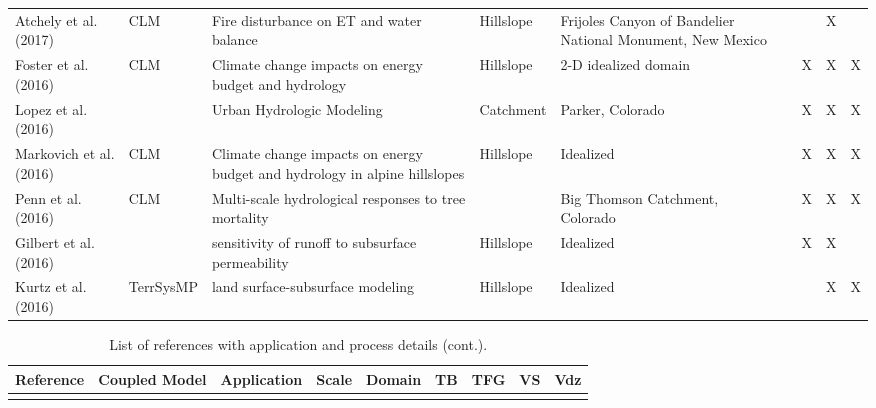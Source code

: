 {\begin{table}
\begin{tabular}{ l  p{1.5cm} p{2cm} p{1.5cm} p{1.5cm} | c | c | c | c }
\cite{Atchley2017} Atchely et al. (2017) & CLM & Fire disturbance on ET and water balance & Hillslope & Frijoles Canyon of Bandelier National Monument, New Mexico & & & X & \\	
\cite{Foster2016} Foster et al. (2016) & CLM & Climate change impacts on energy budget and hydrology & Hillslope & 2-D idealized domain & &X &X &X \\
\cite{Lopez2016} Lopez et al. (2016) &  & Urban Hydrologic Modeling & Catchment & Parker, Colorado & &X &X &X \\
\cite{Markovich2016} Markovich et al. (2016) & CLM & Climate change impacts on energy budget and hydrology in alpine hillslopes & Hillslope & Idealized & &X &X &X \\
\cite{Penn2016} Penn et al. (2016) & CLM & Multi-scale hydrological responses to tree mortality &  & Big Thomson Catchment, Colorado & &X &X &X \\			
\cite{Gilbert2016} Gilbert et al. (2016) &  & sensitivity of runoff to subsurface permeability & Hillslope & Idealized & &X &X & \\			
\cite{Kurtz2016} Kurtz et al. (2016) & TerrSysMP & land surface-subsurface modeling & Hillslope & Idealized & & &X &X \\	
			
\end{tabular}
\label{pfref13}
\end{table}


\begin{table}
\renewcommand{\arraystretch}{2.5}
\center
\caption{List of \parflow{} references with application and process details (cont.).}
\begin{tabular}{ l  p{1.5cm} p{2cm} p{1.5cm} p{1.5cm} | c | c | c | c }
\bf{Reference} & \bf{Coupled Model} & \bf{Application} & \bf{Scale} & \bf{Domain} & \bf{TB} & \bf{TFG} & \bf{VS} & \bf{Vdz} \\ 
\hline{}		


\end{tabular}
\end{table}}
